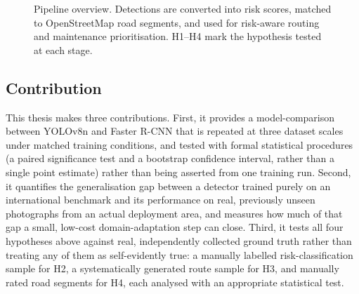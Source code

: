 \documentclass[10pt,a4paper,twocolumn]{article}
\begin{document}
\begin{figure}[t]
  \centering
  \caption{Pipeline overview. Detections are converted into risk scores,
  matched to OpenStreetMap road segments, and used for risk-aware routing
  and maintenance prioritisation. H1--H4 mark the hypothesis tested at
  each stage.}
  \label{fig:pipeline}
\end{figure}

\subsection{Contribution}
\label{sec:contribution}

This thesis makes three contributions. First, it provides a
model-comparison between YOLOv8n and Faster R-CNN that is repeated at
three dataset scales under matched training conditions, and tested with
formal statistical procedures (a paired significance test and a bootstrap
confidence interval, rather than a single point estimate) rather than
being asserted from one training run. Second, it quantifies the
generalisation gap between a detector trained purely on an international
benchmark and its performance on real, previously unseen photographs from
an actual deployment area, and measures how much of that gap a small,
low-cost domain-adaptation step can close. Third, it tests all four
hypotheses above against real, independently collected ground truth
rather than treating any of them as self-evidently true: a manually
labelled risk-classification sample for H2, a systematically generated
route sample for H3, and manually rated road segments for H4, each
analysed with an appropriate statistical test.
\end{document}
